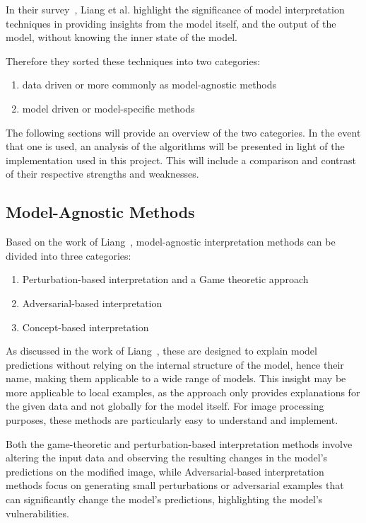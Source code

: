 In their survey~\cite{LIANG2021168}, Liang et al. highlight the significance of model interpretation techniques in providing insights from the model itself, and the output of the model, without knowing the inner state of the model.

Therefore they sorted these techniques into two categories:
\begin{enumerate}
    \item data driven or more commonly as model-agnostic methods
    \item model driven or model-specific methods
\end{enumerate}

The following sections will provide an overview of the two categories.
In the event that one is used, an analysis of the algorithms will be presented in light of the implementation used in this project.
This will include a comparison and contrast of their respective strengths and weaknesses.



\subsection{Model-Agnostic Methods}\label{subsec:model-agnostic-methods}
Based on the work of  Liang~\cite{LIANG2021168}, model-agnostic interpretation methods can be divided into three categories:
\begin{enumerate}
    \item Perturbation-based interpretation and a Game theoretic approach
    \item Adversarial-based interpretation
    \item Concept-based interpretation
\end{enumerate}


As discussed in the work of Liang~\cite{LIANG2021168}, these are designed to explain model predictions without relying
on the internal structure of the model, hence their name, making them applicable to a wide range of models.
This insight may be more applicable to local examples, as the approach only provides explanations for the given data and not globally for the model itself.
For image processing purposes, these methods are particularly easy to understand and implement.

Both the game-theoretic and perturbation-based interpretation methods involve altering the input data
and observing the resulting changes in the model's predictions on the modified image, while Adversarial-based interpretation methods focus on generating small perturbations or adversarial examples that can significantly change the model's predictions, highlighting the model's vulnerabilities.

